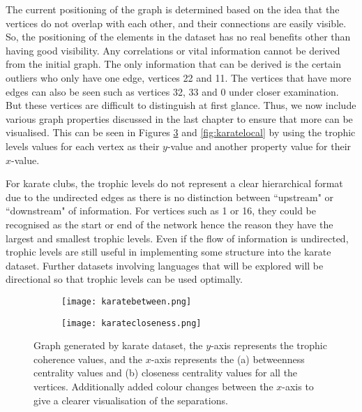 The current positioning of the graph is determined based on the idea that the vertices do not overlap with each other, and their connections are easily visible. So, the positioning of the elements in the dataset has no real benefits other than having good visibility. Any correlations or vital information cannot be derived from the initial graph. The only information that can be derived is the certain outliers who only have one edge, vertices 22 and 11. The vertices that have more edges can also be seen such as vertices 32, 33 and 0 under closer examination. But these vertices are difficult to distinguish at first glance. Thus, we now include various graph properties discussed in the last chapter to ensure that more can be visualised. This can be seen in Figures \ref{fig:karatecentrality} and \ref{fig:karatelocal} by using the trophic levels values for each vertex as their $y$-value and another property value for their $x$-value.

For karate clubs, the trophic levels do not represent a clear hierarchical format due to the undirected edges as there is no distinction between ``upstream" or ``downstream" of information. For vertices such as 1 or 16, they could be recognised as the start or end of the network hence the reason they have the largest and smallest trophic levels. Even if the flow of information is undirected, trophic levels are still useful in implementing some structure into the karate dataset. Further datasets involving languages that will be explored will be directional so that trophic levels can be used optimally.

\begin{figure}[!htb]
\centering
\begin{subfigure}{.45\textwidth}
	\hspace{-2cm}
	\texttt{[image: karatebetween.png]}
	\caption{}
	\label{fig:karatea}
\end{subfigure}
\begin{subfigure}{.45\textwidth}
	\texttt{[image: karatecloseness.png]}
	\caption{}
	\label{fig:karateb}
\end{subfigure}
\caption{Graph generated by karate dataset, the $y$-axis represents the trophic coherence values, and the $x$-axis represents the (a) betweenness centrality values and (b) closeness centrality values for all the vertices. Additionally added colour changes between the $x$-axis to give a clearer visualisation of the separations.}
\label{fig:karatecentrality}
\end{figure}

